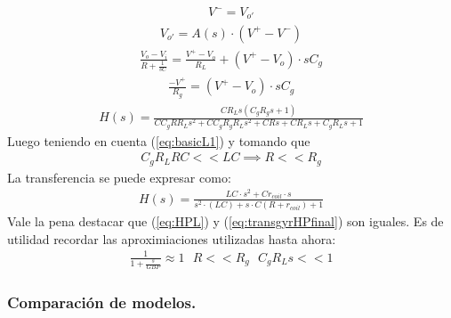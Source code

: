 \begin{align}V^- = V_{o'}\end{align}
\begin{align}V_{o'} = A(s)\cdot (V^+-V^-)\end{align}
\begin{align}\frac{V_o-V_i}{R+\frac{1}{sC}} = \frac{V^+-V_o}{R_L}+(V^+-V_o)\cdot sC_g\end{align}
\begin{align}\frac{-V^+}{R_g}=(V^+-V_o)\cdot sC_g\end{align}
\begin{align} H(s) = \frac{C R_L s \left(C_g R_g s + 1\right)}{C C_g R R_L s^{2} + C C_g R_g R_L s^{2} + C R s + C R_L s + C_g R_L s + 1}\label{eq:transgyrHP}
\end{align}
Luego teniendo en cuenta (\ref{eq:basicL1}) y tomando que
\begin{align} C_gR_LRC<<LC \implies R<<R_g \end{align}
La transferencia  se puede expresar como:
 \begin{align} H(s) = \frac{LC\cdot s^2+Cr_{coil}\cdot s}{s^2 \cdot (LC)+s\cdot C(R+r_{coil})+1}\label{eq:transgyrHPfinal} 
\end{align}
Vale la pena destacar que (\ref{eq:HPL}) y (\ref{eq:transgyrHPfinal}) son iguales.
Es de utilidad recordar las aproximiaciones utilizadas hasta ahora:
\begin{align}  \frac{1}{1+\frac{s}{GBP}}\approx 1  \ \ \ R<<R_g \ \ \ C_gR_Ls << 1 \label{eq:basicL2}\end{align}
\subsubsection{Comparación de modelos.}

